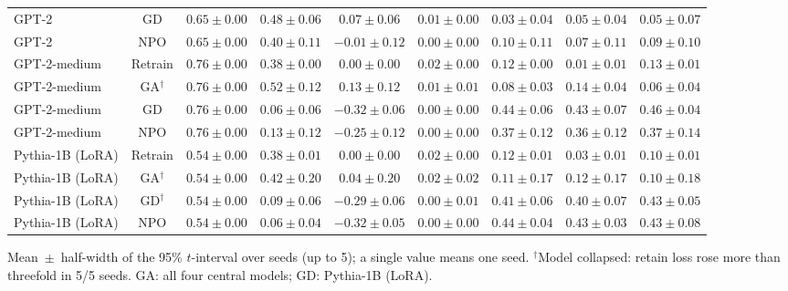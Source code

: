 {\begin{longtable}{@{\extracolsep{\fill}}lcccccccc@{}}
GPT-2 & GD & $0.65 \pm 0.00$ & $0.48 \pm 0.06$ & $0.07 \pm 0.06$ & $0.01 \pm 0.00$ & $0.03 \pm 0.04$ & $0.05 \pm 0.04$ & $0.05 \pm 0.07$ \\
GPT-2 & NPO & $0.65 \pm 0.00$ & $0.40 \pm 0.11$ & $-0.01 \pm 0.12$ & $0.00 \pm 0.00$ & $0.10 \pm 0.11$ & $0.07 \pm 0.11$ & $0.09 \pm 0.10$ \\
GPT-2-medium & Retrain & $0.76 \pm 0.00$ & $0.38 \pm 0.00$ & $0.00 \pm 0.00$ & $0.02 \pm 0.00$ & $0.12 \pm 0.00$ & $0.01 \pm 0.01$ & $0.13 \pm 0.01$ \\
GPT-2-medium & GA$^{\dagger}$ & $0.76 \pm 0.00$ & $0.52 \pm 0.12$ & $0.13 \pm 0.12$ & $0.01 \pm 0.01$ & $0.08 \pm 0.03$ & $0.14 \pm 0.04$ & $0.06 \pm 0.04$ \\
GPT-2-medium & GD & $0.76 \pm 0.00$ & $0.06 \pm 0.06$ & $-0.32 \pm 0.06$ & $0.00 \pm 0.00$ & $0.44 \pm 0.06$ & $0.43 \pm 0.07$ & $0.46 \pm 0.04$ \\
GPT-2-medium & NPO & $0.76 \pm 0.00$ & $0.13 \pm 0.12$ & $-0.25 \pm 0.12$ & $0.00 \pm 0.00$ & $0.37 \pm 0.12$ & $0.36 \pm 0.12$ & $0.37 \pm 0.14$ \\
Pythia-1B (LoRA) & Retrain & $0.54 \pm 0.00$ & $0.38 \pm 0.01$ & $0.00 \pm 0.00$ & $0.02 \pm 0.00$ & $0.12 \pm 0.01$ & $0.03 \pm 0.01$ & $0.10 \pm 0.01$ \\
Pythia-1B (LoRA) & GA$^{\dagger}$ & $0.54 \pm 0.00$ & $0.42 \pm 0.20$ & $0.04 \pm 0.20$ & $0.02 \pm 0.02$ & $0.11 \pm 0.17$ & $0.12 \pm 0.17$ & $0.10 \pm 0.18$ \\
Pythia-1B (LoRA) & GD$^{\dagger}$ & $0.54 \pm 0.00$ & $0.09 \pm 0.06$ & $-0.29 \pm 0.06$ & $0.00 \pm 0.01$ & $0.41 \pm 0.06$ & $0.40 \pm 0.07$ & $0.43 \pm 0.05$ \\
Pythia-1B (LoRA) & NPO & $0.54 \pm 0.00$ & $0.06 \pm 0.04$ & $-0.32 \pm 0.05$ & $0.00 \pm 0.00$ & $0.44 \pm 0.04$ & $0.43 \pm 0.03$ & $0.43 \pm 0.08$ \\
\end{longtable}
Mean~$\pm$~half-width of the 95\% $t$-interval over seeds (up to 5); a single value means one seed. $^{\dagger}$Model collapsed: retain loss rose more than threefold in 5/5 seeds. GA: all four central models; GD: Pythia-1B (LoRA).\par
}
